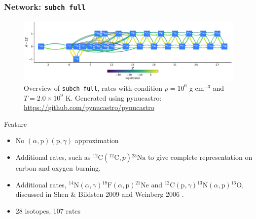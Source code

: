 \documentclass[
	11pt, %
]{beamer}
\begin{document}
\begin{frame}
\frametitle{Network: {\tt subch full}}
    \begin{figure}
        \centering
        \includegraphics[width=1\linewidth]{subch_full.pdf}
        \caption{\scriptsize Overview of {\tt subch full}, rates with condition $\rho = 10^6$ g $\mathrm{cm}^{-3}$ and $T = 2.0 \times 10^9$ K. Generated using {\sf pynucastro}: \url {https://github.com/pynucastro/pynucastro}}
    \end{figure}

    \begin{block}{Feature}
        \begin{itemize}
            \item \scriptsize No $(\alpha, \mbox{p})(\mbox{p}, \gamma)$ approximation
            \item \scriptsize Additional rates, such as ${}^{12}\mbox{C} ({}^{12}\mbox{C}, p){}^{23}\mbox{Na}$ to give complete representation on carbon and oxygen burning.
            \item \scriptsize Additional rates, ${}^{14}\mbox{N}(\alpha,\gamma){}^{18}\mbox{F}(\alpha, \mbox{p}){}^{21}\mbox{Ne}$ and ${}^{12}\mbox{C}(\mbox{p}, \gamma) {}^{13}\mbox{N}(\alpha, \mbox{p}){}^{16}\mbox{O}$, discussed in Shen \& Bildsten 2009 and Weinberg 2006 \cite{Shen_2009,Weinberg_2006}.
            \item 28 isotopes, 107 rates
        \end{itemize}
    \end{block}
\end{frame}
\end{document}
